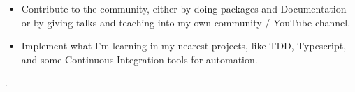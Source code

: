 
\begin{itemize}
    \item Contribute to the community, either by doing packages and Documentation or by giving talks and teaching into my own community / YouTube channel.
    \item Implement what I'm learning in my nearest projects, like TDD, Typescript, and some Continuous Integration tools for automation.
\end{itemize}


\cvsignature  \watermark.
